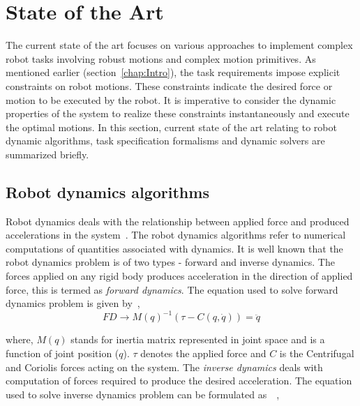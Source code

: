 
\chapter{State of the Art}
%

The current state of the art focuses on various approaches to implement complex robot tasks involving robust motions and complex motion primitives. As mentioned earlier (section~\ref{chap:Intro}), the task requirements impose explicit constraints on robot motions. These constraints indicate the desired force or motion to be executed by the robot. It is imperative to consider the dynamic properties of the system to realize these constraints instantaneously and execute the optimal motions. In this section, current state of the art relating to robot dynamic algorithms, task specification formalisms and dynamic solvers are summarized briefly.

\section{Robot dynamics algorithms}
Robot dynamics deals with the relationship between applied force and produced accelerations in the system~\cite{featherstone2014rigid}. The robot dynamics algorithms refer to numerical computations of quantities associated with dynamics. It is well known that the robot dynamics problem is of two types -  forward and inverse dynamics. The forces applied on any rigid body produces acceleration in the direction of applied force, this is termed as \textit{forward dynamics}. The equation used to solve forward dynamics problem is given by~\cite{featherstone2014rigid},
\begin{equation}\label{eq:fd}
	FD \rightarrow M(q)^{-1} (\tau - C(q, \dot{q})) = \ddot{q}
\end{equation}

where, $M(q)$ stands for inertia matrix represented in joint space and is a function of joint position ($q$). $\tau$ denotes the applied force and $C$ is the Centrifugal and Coriolis forces acting on the system. 
 The \textit{inverse dynamics} deals with computation of forces required to produce the desired acceleration. The equation used to solve inverse dynamics problem can be formulated as~\cite{vukcevic2018extending}~\cite{featherstone2014rigid},


